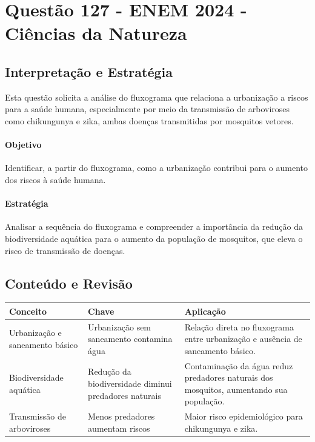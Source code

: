 \documentclass{article}
\begin{document}
\section*{Questão 127 - ENEM 2024 - Ciências da Natureza}

\subsection*{Interpretação e Estratégia}

Esta questão solicita a análise do fluxograma que relaciona a urbanização a riscos para a saúde humana, especialmente por meio da transmissão de arboviroses como chikungunya e zika, ambas doenças transmitidas por mosquitos vetores.

\paragraph{Objetivo}
Identificar, a partir do fluxograma, como a urbanização contribui para o aumento dos riscos à saúde humana.

\paragraph{Estratégia}
Analisar a sequência do fluxograma e compreender a importância da redução da biodiversidade aquática para o aumento da população de mosquitos, que eleva o risco de transmissão de doenças.

\subsection*{Conteúdo e Revisão}

\begin{center}
\begin{tabular}{|p{5cm}|p{6cm}|p{6cm}|}
\hline
\textbf{Conceito} & \textbf{Chave} & \textbf{Aplicação} \\
\hline
Urbanização e saneamento básico & Urbanização sem saneamento contamina água & Relação direta no fluxograma entre urbanização e ausência de saneamento básico. \\
\hline
Biodiversidade aquática & Redução da biodiversidade diminui predadores naturais & Contaminação da água reduz predadores naturais dos mosquitos, aumentando sua população. \\
\hline
Transmissão de arboviroses & Menos predadores aumentam riscos & Maior risco epidemiológico para chikungunya e zika. \\
\hline
\end{tabular}
\end{center}
\end{document}
